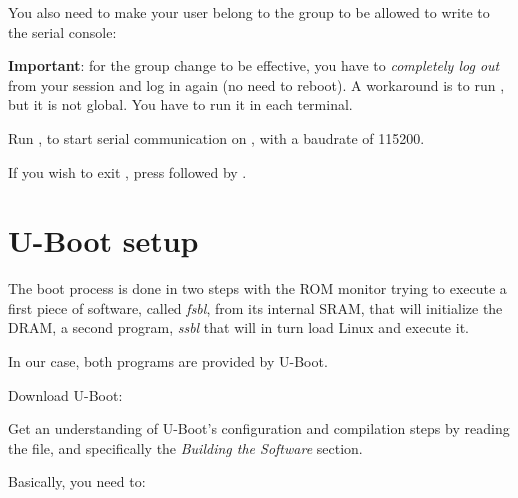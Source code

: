 
You also need to make your user belong to the  group to be
allowed to write to the serial console:


{\bf Important}: for the group change to be effective, you have to
{\em completely log out} from your session and log in again (no need to
reboot). A workaround is to run , but it is not global.
You have to run it in each terminal.

Run , to start serial
communication on , with a baudrate of 115200.

If you wish to exit , press \code{[Ctrl][a]} followed by
\code{[Ctrl][x]}.

\section{U-Boot setup}

The boot process is done in two steps with the ROM monitor trying to
execute a first piece of software, called {\em fsbl}, from its
internal SRAM, that will initialize the DRAM, a second program, {\em
ssbl} that will in turn load Linux and execute it.

In our case, both programs are provided by U-Boot.

Download U-Boot:


Get an understanding of U-Boot's configuration and compilation steps
by reading the  file, and specifically the {\em Building
the Software} section.

Basically, you need to:

